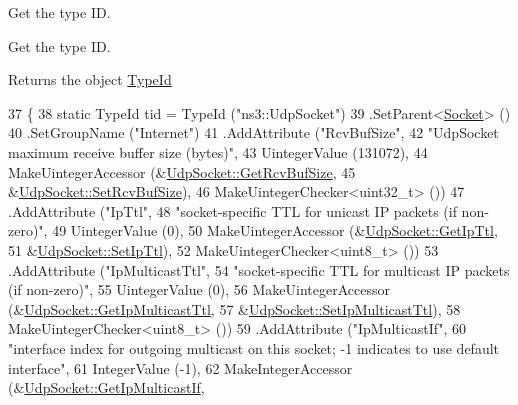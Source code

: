 Get the type ID. 

Get the type ID. \begin{DoxyReturn}{Returns}
the object \hyperlink{classns3_1_1TypeId}{Type\+Id} 
\end{DoxyReturn}

\begin{DoxyCode}
37 \{
38   \textcolor{keyword}{static} TypeId tid = TypeId (\textcolor{stringliteral}{"ns3::UdpSocket"})
39     .SetParent<\hyperlink{classns3_1_1Socket_a1e22267afc490a4b15b8a764289a4000}{Socket}> ()
40     .SetGroupName (\textcolor{stringliteral}{"Internet"})
41     .AddAttribute (\textcolor{stringliteral}{"RcvBufSize"},
42                    \textcolor{stringliteral}{"UdpSocket maximum receive buffer size (bytes)"},
43                    UintegerValue (131072),
44                    MakeUintegerAccessor (&\hyperlink{classns3_1_1UdpSocket_aa222c9c8a78b860f1bceafdd72b54ae0}{UdpSocket::GetRcvBufSize},
45                                          &\hyperlink{classns3_1_1UdpSocket_a4d598f07e803641d6fa869c866caea44}{UdpSocket::SetRcvBufSize}),
46                    MakeUintegerChecker<uint32\_t> ())
47     .AddAttribute (\textcolor{stringliteral}{"IpTtl"},
48                    \textcolor{stringliteral}{"socket-specific TTL for unicast IP packets (if non-zero)"},
49                    UintegerValue (0),
50                    MakeUintegerAccessor (&\hyperlink{classns3_1_1Socket_adf6420d12b8a0b6a20e46c37fe48830d}{UdpSocket::GetIpTtl},
51                                          &\hyperlink{classns3_1_1Socket_a053afd293ef67a359681445c5c7bef2c}{UdpSocket::SetIpTtl}),
52                    MakeUintegerChecker<uint8\_t> ())
53     .AddAttribute (\textcolor{stringliteral}{"IpMulticastTtl"},
54                    \textcolor{stringliteral}{"socket-specific TTL for multicast IP packets (if non-zero)"},
55                    UintegerValue (0),
56                    MakeUintegerAccessor (&\hyperlink{classns3_1_1UdpSocket_a2612696b076f094d3c76363e2e2b8d30}{UdpSocket::GetIpMulticastTtl},
57                                          &\hyperlink{classns3_1_1UdpSocket_af62d9cab3ecae6be95c7c33850126889}{UdpSocket::SetIpMulticastTtl}),
58                    MakeUintegerChecker<uint8\_t> ())
59     .AddAttribute (\textcolor{stringliteral}{"IpMulticastIf"},
60                    \textcolor{stringliteral}{"interface index for outgoing multicast on this socket; -1 indicates to use default
       interface"},
61                    IntegerValue (-1),
62                    MakeIntegerAccessor (&\hyperlink{classns3_1_1UdpSocket_a47d613ffaa57a41bbceb80e6f4ea05e3}{UdpSocket::GetIpMulticastIf},

\end{DoxyCode}
